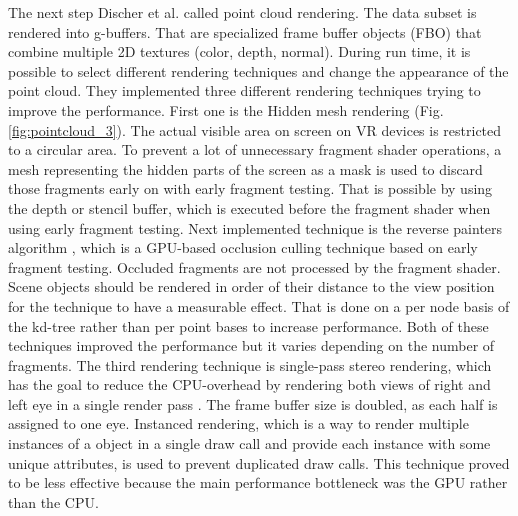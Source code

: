 \documentclass[10pt,twocolumn,letterpaper]{article}
\begin{document}
\setlength{\parindent}{1pc}The next step Discher et al. \cite{discher_point-based_2018} called point cloud rendering. The data subset is rendered into g-buffers. That are specialized frame buffer objects (FBO) that combine multiple 2D textures (color, depth, normal). During run time, it is possible to select different rendering techniques and change the appearance of the point cloud. They implemented three different rendering techniques trying to improve the performance. First one is the Hidden mesh rendering (Fig. \ref{fig:pointcloud_3}). The actual visible area on screen on VR devices is restricted to a circular area. To prevent a lot of unnecessary fragment shader operations, a mesh representing the hidden parts of the screen as a mask is used to discard those fragments early on \cite{Vlachos2015} with early fragment testing. That is possible by using the depth or stencil buffer, which is executed before the fragment shader when using early fragment testing. Next implemented technique is the reverse painters algorithm \cite{foley1996computer}, which is a GPU-based occlusion culling technique based on early fragment testing. Occluded fragments  are not processed by the fragment shader. Scene objects should be rendered in order of their distance to the view position for the technique to have a measurable effect. That is done on a per node basis of the kd-tree rather than per point bases to increase performance. Both of these techniques improved the performance but it varies depending on the number of fragments. The third rendering technique is single-pass stereo rendering, which has the goal to reduce the CPU-overhead by rendering both views of right and left eye in a single render pass \cite{johansson2016efficient}. The frame buffer size is doubled, as each half is assigned to one eye. Instanced rendering, which is a way to render multiple instances of a object in a single draw call and provide each instance with some unique attributes, is used to prevent duplicated draw calls. This technique proved to be less effective because the main performance bottleneck was the GPU rather than the CPU. 
\end{document}
